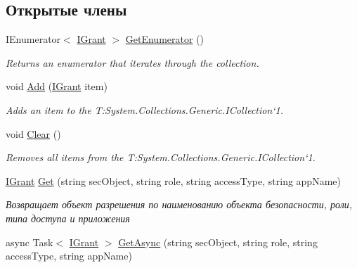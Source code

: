 \subsection*{Открытые члены}
\begin{DoxyCompactItemize}
\item 
I\+Enumerator$<$ \hyperlink{interface_security_1_1_interfaces_1_1_model_1_1_i_grant}{I\+Grant} $>$ \hyperlink{class_security_1_1_entity_framework_1_1_collections_1_1_grant_collection_a87a2ed224fd199be1cedb85272fd49ef}{Get\+Enumerator} ()
\begin{DoxyCompactList}\small\item\em Returns an enumerator that iterates through the collection. \end{DoxyCompactList}\item 
void \hyperlink{class_security_1_1_entity_framework_1_1_collections_1_1_grant_collection_a5862e7e9a12c92f3657c9cc9f2757c6d}{Add} (\hyperlink{interface_security_1_1_interfaces_1_1_model_1_1_i_grant}{I\+Grant} item)
\begin{DoxyCompactList}\small\item\em Adds an item to the T\+:\+System.\+Collections.\+Generic.\+I\+Collection`1. \end{DoxyCompactList}\item 
void \hyperlink{class_security_1_1_entity_framework_1_1_collections_1_1_grant_collection_a5364c2e3da4aeff4ae4526d368f8f6ad}{Clear} ()
\begin{DoxyCompactList}\small\item\em Removes all items from the T\+:\+System.\+Collections.\+Generic.\+I\+Collection`1. \end{DoxyCompactList}\item 
\hyperlink{interface_security_1_1_interfaces_1_1_model_1_1_i_grant}{I\+Grant} \hyperlink{class_security_1_1_entity_framework_1_1_collections_1_1_grant_collection_ac455a6ad4f139cd24c65ae720860118b}{Get} (string sec\+Object, string role, string access\+Type, string app\+Name)
\begin{DoxyCompactList}\small\item\em Возвращает объект разрешения по наименованию объекта безопасности, роли, типа доступа и приложения \end{DoxyCompactList}\item 
async Task$<$ \hyperlink{interface_security_1_1_interfaces_1_1_model_1_1_i_grant}{I\+Grant} $>$ \hyperlink{class_security_1_1_entity_framework_1_1_collections_1_1_grant_collection_aa5fe3b6f85d147ddfc0c2f0c5ff8aac0}{Get\+Async} (string sec\+Object, string role, string access\+Type, string app\+Name)

\end{DoxyCompactItemize}
